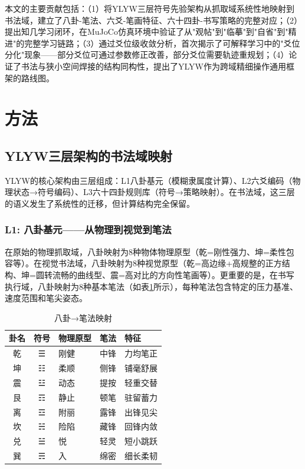 本文的主要贡献包括：（1）将YLYW三层符号先验架构从抓取域系统性地映射到书法域，建立了八卦-笔法、六爻-笔画特征、六十四卦-书写策略的完整对应；（2）提出知几学习闭环，在MuJoCo仿真环境中验证了从"观帖"到"临摹"到"自省"到"精进"的完整学习链路；（3）通过爻位级收敛分析，首次揭示了可解释学习中的"爻位分化"现象——部分爻位可通过参数修正改善，部分爻位需要轨迹重规划；（4）论证了书法与狭小空间焊接的结构同构性，提出了YLYW作为跨域精细操作通用框架的路线图。

\section{方法}

\subsection{YLYW三层架构的书法域映射}

YLYW的核心架构由三层组成：L1八卦基元（模糊隶属度计算）、L2六爻编码（物理状态→符号编码）、L3六十四卦规则库（符号→策略映射）。在书法域，这三层的语义发生了系统性的迁移，但计算结构完全保留。

\subsubsection{L1: 八卦基元——从物理到视觉到笔法}

在原始的物理抓取域，八卦映射为8种物体物理原型（乾=刚性强力、坤=柔性包容等）。在视觉书法域，八卦映射为8种视觉原型（乾=高边缘+高规整的正方结构、坤=圆转流畅的曲线型、震=高对比的方向性笔画等）。更重要的是，在书写执行域，八卦映射为8种基本笔法（如表\ref{tab:trigram_brush}所示），每种笔法包含特定的压力基准、速度范围和笔尖姿态。

\begin{table}[htbp]
\centering
\caption{八卦→笔法映射}
\label{tab:trigram_brush}
\begin{tabular}{cclll}
\toprule
卦名 & 符号 & 物理原型 & 笔法 & 特征 \\
\midrule
乾 & ☰ & 刚健 & 中锋 & 力均笔正 \\
坤 & ☷ & 柔顺 & 侧锋 & 铺毫舒展 \\
震 & ☳ & 动态 & 提按 & 轻重交替 \\
艮 & ☶ & 静止 & 顿笔 & 驻留蓄力 \\
离 & ☲ & 附丽 & 露锋 & 出锋见尖 \\
坎 & ☵ & 险陷 & 藏锋 & 回锋内敛 \\
兑 & ☱ & 悦 & 轻灵 & 短小跳跃 \\
巽 & ☴ & 入 & 绵密 & 细长柔韧 \\
\bottomrule
\end{tabular}
\end{table}

